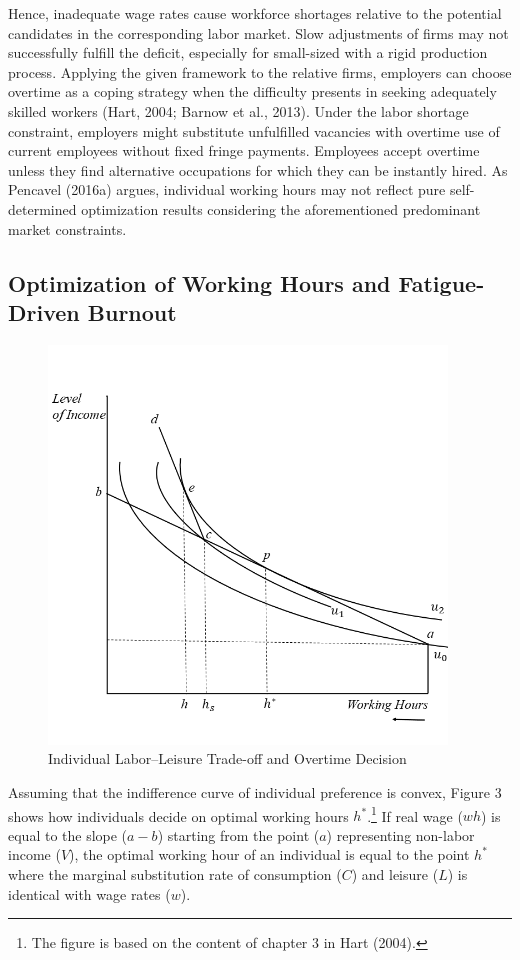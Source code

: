 \documentclass[
  12pt,
]{article}
\begin{document}
Hence, inadequate wage rates cause workforce shortages relative to the
potential candidates in the corresponding labor market. Slow adjustments
of firms may not successfully fulfill the deficit, especially for
small-sized with a rigid production process. Applying the given
framework to the relative firms, employers can choose overtime as a
coping strategy when the difficulty presents in seeking adequately
skilled workers (Hart, 2004; Barnow et al., 2013). Under the labor
shortage constraint, employers might substitute unfulfilled vacancies
with overtime use of current employees without fixed fringe payments.
Employees accept overtime unless they find alternative occupations for
which they can be instantly hired. As Pencavel (2016a) argues,
individual working hours may not reflect pure self-determined
optimization results considering the aforementioned predominant market
constraints.

\subsection{Optimization of Working Hours and Fatigue-Driven
Burnout}\label{optimization-of-working-hours-and-fatigue-driven-burnout}

\begin{figure}
\centering
\includegraphics[width=4.16667in,height=\textheight,keepaspectratio]{figure/Individual overwork decision.png}
\caption{Individual Labor--Leisure Trade-off and Overtime Decision}
\end{figure}

Assuming that the indifference curve of individual preference is convex,
Figure 3 shows how individuals decide on optimal working hours
\(h^*\).\footnote{The figure is based on the content of chapter 3 in
  Hart (2004).} If real wage (\(wh\)) is equal to the slope (\(a-b\))
starting from the point (\(a\)) representing non-labor income (\(V\)),
the optimal working hour of an individual is equal to the point \(h^*\)
where the marginal substitution rate of consumption (\(C\)) and leisure
(\(L\)) is identical with wage rates (\(w\)).
\end{document}
